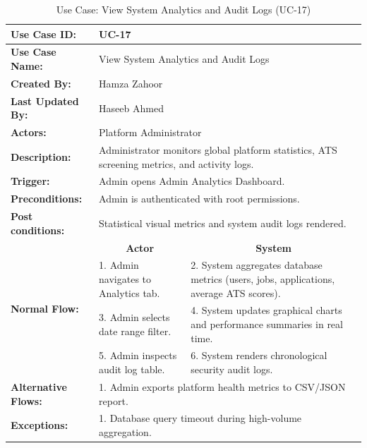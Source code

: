 \begin{table}[H]
\centering
\small
\caption{Use Case: View System Analytics and Audit Logs (UC-17)}
\label{tab:uc17_spec}
\begin{tabular}{|p{3.2cm}|p{5.5cm}|p{5.5cm}|}
\hline
\textbf{Use Case ID:} & \multicolumn{2}{p{11.4cm}|}{UC-17} \\ \hline
\textbf{Use Case Name:} & \multicolumn{2}{p{11.4cm}|}{View System Analytics and Audit Logs} \\ \hline
\textbf{Created By:} & \multicolumn{2}{p{11.4cm}|}{Hamza Zahoor} \\ \hline
\textbf{Last Updated By:} & \multicolumn{2}{p{11.4cm}|}{Haseeb Ahmed} \\ \hline
\textbf{Actors:} & \multicolumn{2}{p{11.4cm}|}{Platform Administrator} \\ \hline
\textbf{Description:} & \multicolumn{2}{p{11.4cm}|}{Administrator monitors global platform statistics, ATS screening metrics, and activity logs.} \\ \hline
\textbf{Trigger:} & \multicolumn{2}{p{11.4cm}|}{Admin opens Admin Analytics Dashboard.} \\ \hline
\textbf{Preconditions:} & \multicolumn{2}{p{11.4cm}|}{Admin is authenticated with root permissions.} \\ \hline
\textbf{Post conditions:} & \multicolumn{2}{p{11.4cm}|}{Statistical visual metrics and system audit logs rendered.} \\ \hline
\multirow{4}{*}{\textbf{Normal Flow:}} & \multicolumn{1}{c|}{\textbf{Actor}} & \multicolumn{1}{c|}{\textbf{System}} \\ \cline{2-3}
& 1. Admin navigates to Analytics tab. & 2. System aggregates database metrics (users, jobs, applications, average ATS scores). \vspace{2pt} \\
& 3. Admin selects date range filter. & 4. System updates graphical charts and performance summaries in real time. \vspace{2pt} \\
& 5. Admin inspects audit log table. & 6. System renders chronological security audit logs. \\ \hline
\textbf{Alternative Flows:} & \multicolumn{2}{p{11.4cm}|}{1. Admin exports platform health metrics to CSV/JSON report.} \\ \hline
\textbf{Exceptions:} & \multicolumn{2}{p{11.4cm}|}{1. Database query timeout during high-volume aggregation.} \\ \hline
\end{tabular}
\end{table}

